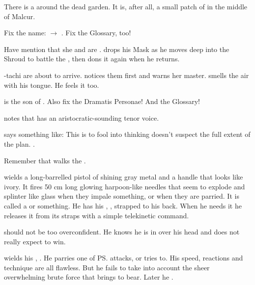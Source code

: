 \begin{garbage}
\begin{changes}
    There is a  around the dead garden. 
    It is, after all, a small patch of \wylde{} in the middle of Malcur.
    
    Fix the name: 
    \Rystessakhin{} $\to$ \AeocrithRystessakhin. 
    Fix the Glossary, too! 
    
    Have \Criseis{} mention that she and \Ishnaruchaefir{} are . 
    \Ishnaruchaefir{} drops his Mask as he moves deep into the Shroud to battle the \ghobal, then dons it again when he returns. 
    
    \Teshrial-tachi are about to arrive. 
    \Criseis{} notices them first and warns her master. 
    \Ishnaruchaefir{} smells the air with his tongue. 
    He feels it too.
    
    \Teshrial{} is the son of \Zereth. 
    Also fix the Dramatis Personae! 
    And the Glossary! 
    
    \Criseis{} notes that \Teshrial{} has an aristocratic-sounding tenor voice. 
    
    \Ishnaruchaefir{} says something like: 
    This is to fool \Teshrial{} into thinking \Ishnaruchaefir{} doesn't suspect the full extent of the \ghobal{} plan. 
    . 
    
    Remember that \Teshrial{} walks the . 
    
    \Teshrial{} wields a long-barrelled pistol of shining gray metal and a handle that looks like ivory. 
    It fires 50 cm long glowing harpoon-like needles that seem to explode and splinter like glass when they impale something, or when they are parried. 
    It is called a  or something. 
    He has his \senaan, \Turishah, strapped to his back. 
    When he needs it he releases it from its straps with a simple telekinetic command. 
    
    \Teshrial{} should not be too overconfident. 
    He knows he is in over his head and does not really expect to win. 
    
    \Teshrial{} wields his , . 
    He parries one of \ps{\Ishnaruchaefir} attacks, or tries to. 
    His speed, reactions and technique are all flawless. 
    But he fails to take into account the sheer overwhelming brute force that \Ishnaruchaefir{} brings to bear. 
    Later he . 
    

\end{changes}
\end{garbage}
